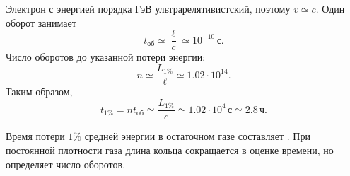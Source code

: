 \documentclass[../final.tex]{subfiles}
\begin{document}
Электрон с энергией порядка ГэВ ультрарелятивистский, поэтому $v\simeq c$.
Один оборот занимает
\begin{equation*}
    t_{\text{об}}\simeq\frac{\ell}{c}
    \simeq10^{-10}\,\text{с}.
\end{equation*}
Число оборотов до указанной потери энергии:
\begin{equation*}
    n\simeq\frac{L_{1\%}}{\ell}\simeq1.02\cdot10^{14}.
\end{equation*}
Таким образом,
\begin{equation*}
    t_{1\%}=nt_{\text{об}}\simeq\frac{L_{1\%}}c
    \simeq1.02\cdot10^4\,\text{с}\simeq2.8\,\text{ч}.
\end{equation*}

\answer
Время потери $1\%$ средней энергии в остаточном газе составляет
.
При постоянной плотности газа длина кольца сокращается в оценке времени,
но определяет число оборотов.
\end{document}
